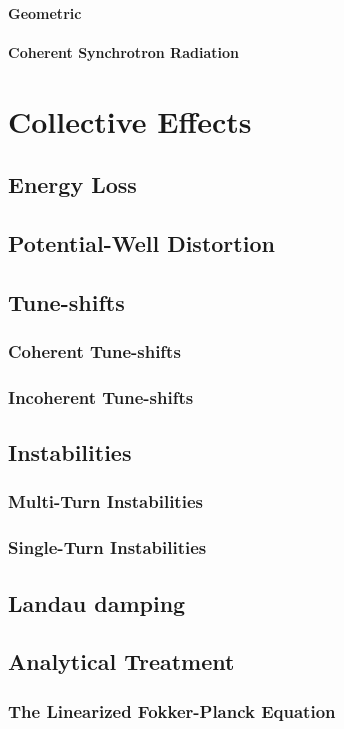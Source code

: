 \subsubsection{Geometric}
\subsubsection{Coherent Synchrotron Radiation}


\chapter{Collective Effects}
\section{Energy Loss}
\section{Potential-Well Distortion}
\section{Tune-shifts}
\subsection{Coherent Tune-shifts}
\subsection{Incoherent Tune-shifts}
\section{Instabilities}
\subsection{Multi-Turn Instabilities}
\subsection{Single-Turn Instabilities}
\section{Landau damping}
\section{Analytical Treatment}
\subsection{The Linearized Fokker-Planck Equation}
